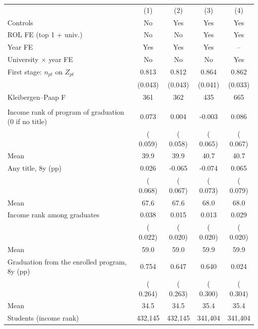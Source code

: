 \begin{tabular}{lcccc}
\toprule
 & (1) & (2) & (3) & (4) \\
Controls & No & Yes & Yes & Yes \\
ROL FE (top 1 + univ.) & No & No & Yes & Yes \\
Year FE & Yes & Yes & Yes & -- \\
University \(\times\) year FE & No & No & No & Yes \\
\midrule
First stage: \(n_{pt}\) on \(Z_{pt}\) &  0.813 &  0.812 &  0.864 &  0.862 \\
 & (0.043) & (0.043) & (0.041) & (0.033) \\
Kleibergen--Paap F &    361 &    362 &    435 &    665 \\
\addlinespace
\multicolumn{5}{l}{2SLS, per 10 entrants} \\
\quad Income rank of program of graduation (0 if no title) &   0.073 &   0.004 &  -0.003 &   0.086 \\
 & ( 0.059) & ( 0.058) & ( 0.065) & ( 0.067) \\
\quad \quad Mean &   39.9 &   39.9 &   40.7 &   40.7 \\
\quad Any title, 8y (pp) &   0.026 &  -0.065 &  -0.074 &   0.065 \\
 & ( 0.068) & ( 0.067) & ( 0.073) & ( 0.079) \\
\quad \quad Mean &   67.6 &   67.6 &   68.0 &   68.0 \\
\quad Income rank among graduates &   0.038\sym{*} &   0.015 &   0.013 &   0.029 \\
 & ( 0.022) & ( 0.020) & ( 0.020) & ( 0.020) \\
\quad \quad Mean &   59.0 &   59.0 &   59.9 &   59.9 \\
\quad Graduation from the enrolled program, 8y (pp) &   0.754\sym{***} &   0.647\sym{**} &   0.640\sym{**} &   0.024 \\
 & ( 0.264) & ( 0.263) & ( 0.300) & ( 0.304) \\
\quad \quad Mean &   34.5 &   34.5 &   35.4 &   35.4 \\
\midrule
Students (income rank) &   432,145 &   432,145 &   341,404 &   341,404 \\
\bottomrule
\end{tabular}
